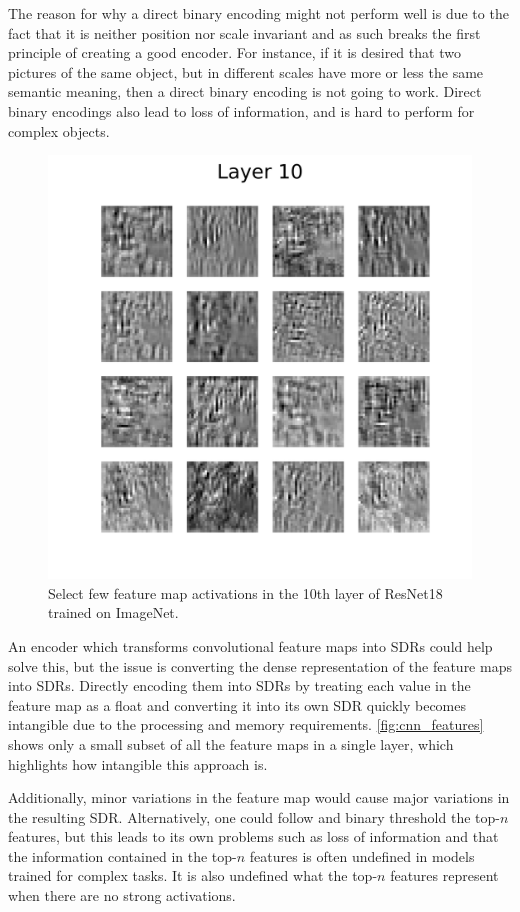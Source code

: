 \par
The reason for why a direct binary encoding might not perform well is due to the fact that it is neither position nor scale invariant and as such breaks the first principle of creating a good encoder. For instance, if it is desired that two pictures of the same object, but in different scales have more or less the same semantic meaning, then a direct binary encoding is not going to work. Direct binary encodings also lead to loss of information, and is hard to perform for complex objects.
\begin{figure}[H]
    \centering
    \includegraphics[width=\linewidth]{resources/related_works/resnet18_layer_10.png}
    \caption{Select few feature map activations in the 10th layer of ResNet18\cite{resnet} trained on ImageNet\cite{imagenet}.}
    \label{fig:cnn_features}
\end{figure}
\par
An encoder which transforms convolutional feature maps into SDRs could help solve this, but the issue is converting the dense representation of the feature maps into SDRs. Directly encoding them into SDRs by treating each value in the feature map as a float and converting it into its own SDR quickly becomes intangible due to the processing and memory requirements. \autoref{fig:cnn_features} shows only a small subset of all the feature maps in a single layer, which highlights how intangible this approach is.
\par
Additionally, minor variations in the feature map would cause major variations in the resulting SDR. Alternatively, one could follow \textcite{CNN_HTM} and binary threshold the top-$n$ features, but this leads to its own problems such as loss of information and that the information contained in the top-$n$ features is often undefined in models trained for complex tasks. It is also undefined what the top-$n$ features represent when there are no strong activations.

